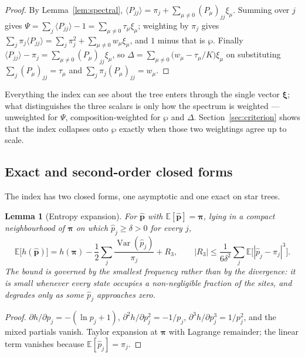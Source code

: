\documentclass[11pt]{article}
\newcommand{\bpi}{\boldsymbol{\pi}}
\newcommand{\bxi}{\boldsymbol{\xi}}
\newcommand{\E}{\mathbb{E}}
\newcommand{\Var}{\operatorname{Var}}
\newtheorem{lemma}[theorem]{Lemma}
\theoremstyle{definition}
\theoremstyle{remark}
\begin{document}
\begin{proof}
By Lemma~\ref{lem:spectral},
$\langle P_{jj}\rangle=\pi_j+\sum_{\mu\ne0}(P_\mu)_{jj}\xi_\mu$. Summing over
$j$ gives $\Psi=\sum_j\langle P_{jj}\rangle-1=\sum_{\mu\ne0}\tau_\mu\xi_\mu$;
weighting by $\pi_j$ gives
$\sum_j\pi_j\langle P_{jj}\rangle=\sum_j\pi_j^2+\sum_{\mu\ne0}w_\mu\xi_\mu$,
and $1$ minus that is $\wp$. Finally
$\langle P_{jj}\rangle-\pi_j=\sum_{\mu\ne0}(P_\mu)_{jj}\xi_\mu$, so
$\Delta=\sum_{\mu\ne0}\bigl(w_\mu-\tau_\mu/K\bigr)\xi_\mu$ on substituting
$\sum_j(P_\mu)_{jj}=\tau_\mu$ and $\sum_j\pi_j(P_\mu)_{jj}=w_\mu$.
\end{proof}

Everything the index can see about the tree enters through the single vector
$\bxi$; what distinguishes the three scalars is only how the spectrum is
weighted --- unweighted for $\Psi$, composition-weighted for $\wp$ and
$\Delta$. Section~\ref{sec:criterion} shows that the index collapses onto
$\wp$ exactly when those two weightings agree up to scale.

\subsection{Exact and second-order closed forms}

The index has two closed forms, one asymptotic and one exact on star trees.

\begin{lemma}[Entropy expansion]
\label{lem:entropy}
For $\hat{\mathbf p}$ with $\E[\hat{\mathbf p}]=\bpi$, lying in a compact
neighbourhood of $\bpi$ on which $\hat p_j\ge\delta>0$ for every $j$,
\begin{equation}
  \E\bigl[h(\hat{\mathbf p})\bigr]
  =h(\bpi)-\frac12\sum_j\frac{\Var(\hat p_j)}{\pi_j}+R_3,
  \qquad
  |R_3|\le\frac{1}{6\delta^2}\sum_j\E\bigl[|\hat p_j-\pi_j|^3\bigr].
\end{equation}
The bound is governed by the smallest frequency rather than by the
divergence: it is small whenever every state occupies a non-negligible
fraction of the sites, and degrades only as some $\hat p_j$ approaches zero.
\end{lemma}

\begin{proof}
$\partial h/\partial p_j=-(\ln p_j+1)$, $\partial^2h/\partial p_j^2=-1/p_j$,
$\partial^3h/\partial p_j^3=1/p_j^2$, and the mixed partials vanish. Taylor
expansion at $\bpi$ with Lagrange remainder; the linear term vanishes because
$\E[\hat p_j]=\pi_j$.
\end{proof}
\end{document}
